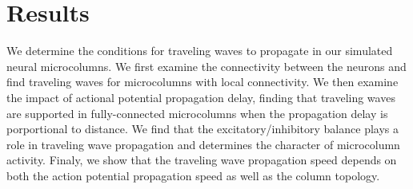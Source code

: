 \documentclass[a4paper,11pt]{article}
\begin{document}
\section{Results}
We determine the conditions for traveling waves to propagate in our simulated neural microcolumns.
We first examine the connectivity between the neurons and find traveling waves for microcolumns with local connectivity.
We then examine the impact of actional potential propagation delay, finding that traveling waves are supported in fully-connected microcolumns when the propagation delay is porportional to distance.
We find that the excitatory/inhibitory balance plays a role in traveling wave propagation and determines the character of microcolumn activity.
Finaly, we show that the traveling wave propagation speed depends on both the action potential propagation speed as well as the column topology.
\end{document}
